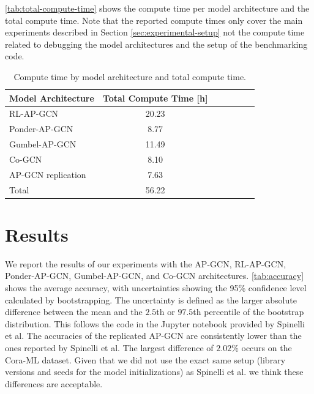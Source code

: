 \documentclass{gdl}
\begin{document}
\autoref{tab:total-compute-time} shows the compute time per model architecture and the total compute time. Note that the reported compute times only cover the main experiments described in Section \ref{sec:experimental-setup} not the compute time related to debugging the model architectures and the setup of the benchmarking code.

\begin{table}[h]
    \centering
    \small\sf
    \setlength{\tabcolsep}{2pt}
    \captionsetup{justification=centerlast}
    \caption{Compute time by model architecture and total compute time.}
    \begin{tabular}{l c c c c c c}
        \toprule
        Model Architecture & Total Compute Time [h]\\
        \midrule
        RL-AP-GCN & 20.23 \\
        Ponder-AP-GCN & 8.77 \\
        Gumbel-AP-GCN & 11.49 \\
        Co-GCN & 8.10   \\
        AP-GCN replication & 7.63  \\
        \midrule
        Total & 56.22 \\
        \bottomrule
    \end{tabular}
    \label{tab:total-compute-time}
\end{table}


\section{Results}
We report the results of our experiments with the AP-GCN, RL-AP-GCN, Ponder-AP-GCN, Gumbel-AP-GCN, and Co-GCN architectures. \autoref{tab:accuracy} shows the average accuracy, with uncertainties showing the 95\% confidence level calculated by bootstrapping. The uncertainty is defined as the larger absolute difference between the mean and the $2.5$th or $97.5$th percentile of the bootstrap distribution. This follows the code in the Jupyter notebook provided by Spinelli et al. The accuracies of the replicated AP-GCN are consistently lower than the ones reported by Spinelli et al. The largest difference of $2.02\%$ occurs on the Cora-ML dataset. Given that we did not use the exact same setup (library versions and seeds for the model initializations) as Spinelli et al. we think these differences are acceptable. 
\end{document}
